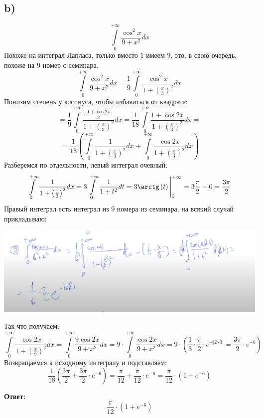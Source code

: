 \documentclass[a4paper,12pt]{article}
\begin{document}
\subsection*{b)}
\[
\int\limits_0^{+\infty} \frac{\cos^2 x}{9 + x^2} dx
\]
Похоже на интеграл Лапласа, только вместо $1$ имеем $9$, это, в свою очередь, похоже на 9 номер с семинара.
\[
\int\limits_0^{+\infty} \frac{\cos^2 x}{9 + x^2} dx
=
\frac{1}{9} 
\int\limits_0^{+\infty} \frac{\cos^2 x}{1 + \left(\frac{x}{3}\right)^2} dx
\]
Понизим степень у косинуса, чтобы избавиться от квадрата:
\[
=
\frac{1}{9} 
\int\limits_0^{+\infty} \frac{\frac{1 + \cos 2x}{2}}{1 + \left(\frac{x}{3}\right)^2} dx
=
\frac{1}{18} 
\int\limits_0^{+\infty} \frac{1 + \cos 2x}{1 + \left(\frac{x}{3}\right)^2} dx
=
\]
\[
=
\frac{1}{18} 
\left( 
\int\limits_0^{+\infty} \frac{1}{1 + \left(\frac{x}{3}\right)^2} dx
+
\int\limits_0^{+\infty} \frac{\cos 2x}{1 + \left(\frac{x}{3}\right)^2} dx
\right)
\]
Разберемся по отдельности, левый интеграл очевный:
\[
\int\limits_0^{+\infty} \frac{1}{1 + \left(\frac{x}{3}\right)^2} dx 
=
3
\int\limits_0^{+\infty} \frac{1}{1 + t^2} dt
=
3\arctg \left(t\right) \Bigg|_0^{+\infty}  = 3\frac{\pi}{2} - 0 = \frac{3\pi}{2} 
\]
Правый интеграл есть интеграл из 9 номера из семинара, на всякий случай прикладываю:
\begin{center}
\includegraphics[scale=0.3]{7.png}
\end{center}
Так что получаем:
\[
\int\limits_0^{+\infty} \frac{\cos 2x}{1 + \left(\frac{x}{9}\right)^2} dx = 
\int\limits_0^{+\infty} \frac{9\cos 2x}{9 + x^2} dx = 9 \cdot \int\limits_0^{+\infty} \frac{\cos 2x}{9 + x^2} dx  =
9 \cdot \left(
\frac{1}{3} \cdot \frac{\pi}{2} \cdot e^{-|2 \cdot 3|}
=
\frac{3\pi}{2} \cdot e^{-6}
\right)
\]
Возвращаемся к исходному интегралу и подставляем:
\[
\frac{1}{18} \left(
\frac{3\pi}{2} + \frac{3\pi}{2} \cdot e^{-6}
\right)
=
\frac{\pi}{12} + \frac{\pi}{12} \cdot e^{-6} = \frac{\pi}{12} \cdot (1 + e^{-6})
\]
\begin{center}
\textbf{Ответ: } 
\[
\frac{\pi}{12} \cdot (1 + e^{-6})
\]                               
\end{center}
\end{document}
